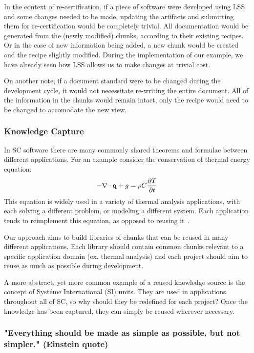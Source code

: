 \documentclass{sig-alternate-05-2015}
\newcommand{\lss}{LSS}
\begin{document}
In the context of re-certification, if a piece of software were developed using
\lss{} and some changes needed to be made, updating the artifacts and submitting
them for re-certification would be completely trivial. All documentation would
be generated from the (newly modified) chunks, according to their existing
recipes. Or in the case of new information being added, a new chunk would be
created and the recipe slightly modified. During the implementation of our
example, we have already seen how \lss{} allows us to make changes at trivial
cost.

On another note, if a document standard were to be changed during the
development cycle, it would not necessitate re-writing the entire document. All
of the information in the chunks would remain intact, only the recipe would need
to be changed to accomodate the new view.

\subsubsection{Knowledge Capture} \label{sssec:adv_knowledge}

In SC software there are many commonly shared theorems and formulae between
different applications. For an example consider the conservation of thermal
energy equation:
\begin{displaymath} -{\bf \nabla \cdot q} + g = \rho C
\frac{\partial T}{\partial t} \end{displaymath}
This equation is widely used in a variety of thermal analysis applications, with
each solving a different problem, or modeling a different system. Each
application tends to reimplement this equation, as opposed to reusing
it~\cite{TODO}. %

Our approach aims to build libraries of chunks that can be reused in many
different applications. Each library should contain common chunks relevant to a
specific application domain (ex. thermal analysis) and each project should aim
to reuse as much as possible during development.

A more abstract, yet more common example of a reused knowledge source is the
concept of Syst\'{e}me International (SI) units. They are used in applications
throughout all of SC, so why should they be redefined for each project? Once the
knowledge has been captured, they can simply be reused wherever necessary.

\subsubsection{"Everything should be made as simple as possible, but not
  simpler."  (Einstein quote)} \label{sssec:adv_simple}
\end{document}
